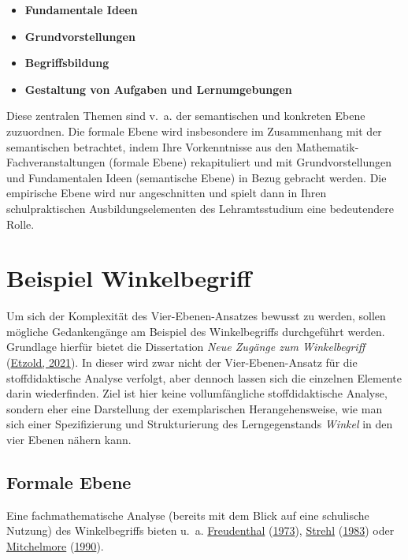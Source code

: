 \documentclass[
  ngerman,
]{scrbook}
\providecommand{\tightlist}{%
  \setlength{\itemsep}{0pt}\setlength{\parskip}{0pt}}
\theoremstyle{definition}
\theoremstyle{definition}
\theoremstyle{definition}
\theoremstyle{definition}
\theoremstyle{remark}
\begin{document}
\begin{itemize}
\tightlist
\item
  \textbf{Fundamentale Ideen}
\item
  \textbf{Grundvorstellungen}
\item
  \textbf{Begriffsbildung}
\item
  \textbf{Gestaltung von Aufgaben und Lernumgebungen}
\end{itemize}

Diese zentralen Themen sind v.~a. der \textcolor{semanticColor}{semantischen} und \textcolor{concreteColor}{konkreten} Ebene zuzuordnen. Die \textcolor{formalColor}{formale} Ebene wird insbesondere im Zusammenhang mit der semantischen betrachtet, indem Ihre Vorkenntnisse aus den Mathematik-Fachveranstaltungen (formale Ebene) rekapituliert und mit Grundvorstellungen und Fundamentalen Ideen (semantische Ebene) in Bezug gebracht werden. Die \textcolor{empiricColor}{empirische} Ebene wird nur angeschnitten und spielt dann in Ihren schulpraktischen Ausbildungselementen des Lehramtsstudium eine bedeutendere Rolle.

\hypertarget{beispiel-winkelbegriff}{%
\section{Beispiel Winkelbegriff}\label{beispiel-winkelbegriff}}

Um sich der Komplexität des Vier-Ebenen-Ansatzes bewusst zu werden, sollen mögliche Gedankengänge am Beispiel des Winkelbegriffs durchgeführt werden. Grundlage hierfür bietet die Dissertation \emph{Neue Zugänge zum Winkelbegriff} (\protect\hyperlink{ref-Etzold2021}{Etzold, 2021}). In dieser wird zwar nicht der Vier-Ebenen-Ansatz für die stoffdidaktische Analyse verfolgt, aber dennoch lassen sich die einzelnen Elemente darin wiederfinden. Ziel ist hier keine vollumfängliche stoffdidaktische Analyse, sondern eher eine Darstellung der exemplarischen Herangehensweise, wie man sich einer Spezifizierung und Strukturierung des Lerngegenstands \emph{Winkel} in den vier Ebenen nähern kann.

\hypertarget{formale-ebene}{%
\subsection{Formale Ebene}\label{formale-ebene}}

Eine fachmathematische Analyse (bereits mit dem Blick auf eine schulische Nutzung) des Winkelbegriffs bieten u.~a. \protect\hyperlink{ref-Freudenthal:1973}{Freudenthal} (\protect\hyperlink{ref-Freudenthal:1973}{1973}), \protect\hyperlink{ref-Strehl:1983}{Strehl} (\protect\hyperlink{ref-Strehl:1983}{1983}) oder \protect\hyperlink{ref-Mitchelmore:1990}{Mitchelmore} (\protect\hyperlink{ref-Mitchelmore:1990}{1990}).
\end{document}

